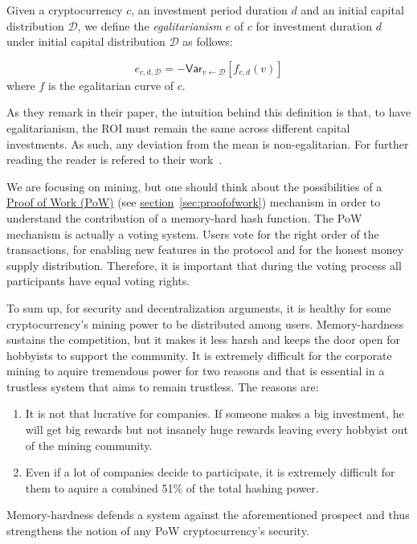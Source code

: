 \begin{definition}[Egalitarianism]
  Given a cryptocurrency $c$, an investment period duration $d$ and an initial
  capital distribution $\mathcal{D}$, we define the \emph{egalitarianism} $e$ of $c$
  for investment duration $d$ under initial capital distribution $\mathcal{D}$
  as follows:

  \begin{equation}
    e_{c,d,\mathcal{D}} = -\textsf{Var}_{v \gets \mathcal{D}}[f_{c,d}(v)]
  \end{equation}
  where $f$ is the egalitarian curve of $c$.
\end{definition}

As they remark in their paper, the intuition behind this definition is that, to have egalitarianism, the ROI
must remain the same across different capital investments. As such, any
deviation from the mean is non-egalitarian. For further reading the reader is refered to their work~\cite{egalitarianism}.
\pagebreak

We are focusing on mining, but one should think about the possibilities of a \hyperref[sec:proofofwork]{Proof of Work (PoW)} (see \hyperref[sec:proofofwork]{section}~\ref{sec:proofofwork}) mechanism in order to understand the contribution of a memory-hard hash function. The PoW mechanism is actually a voting system. Users vote for the right order of the transactions, for enabling new features in the protocol and for the honest money supply distribution. Therefore, it is important that during the voting process all participants have equal voting rights.

To sum up, for security and decentralization arguments, it is healthy for some cryptocurrency's mining power to be distributed among users. Memory-hardness sustains the competition, but it makes it less harsh and keeps the door open for hobbyists to support the community. It is extremely difficult for the corporate mining to aquire tremendous power for two reasons and that is essential in a trustless system that aims to remain trustless. The reasons are:
\begin{enumerate}[label=(\greek*)]
  \item It is not that lucrative for companies. If someone makes a big investment, he will get big rewards but not insanely huge rewards leaving every hobbyist out of the mining community.
  \item Even if a lot of companies decide to participate, it is extremely difficult for them to aquire a combined 51\% of the total hashing power.
\end{enumerate}

Memory-hardness defends a system against the aforementioned prospect and thus strengthens the notion of any PoW cryptocurrency's security.

